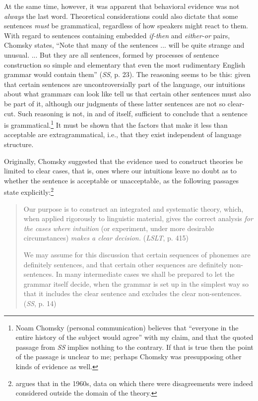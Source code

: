 At the same time, however, it was apparent that behavioral evidence was not \textit{always} the last word. Theoretical considerations could also dictate that some sentences \textit{must} be grammatical, regardless of how speakers might react to them. With regard to sentences containing embedded \textit{if-then} and \textit{either-or} pairs, Chomsky states, ``Note that many of the sentences ... will be quite strange and unusual. ... But they are all  sentences, formed by processes of sentence construction so simple and elementary that even the most rudimentary English grammar would contain them'' (\textit{SS}, p. 23). The reasoning seems to be this: given that
certain sentences are uncontroversially part of the language, our intuitions about what grammars can look like tell us that certain other sentences must also be part of it, although our judgments of these latter sentences are not so clear-cut. Such reasoning is not, in and of itself, sufficient to conclude that a sentence is grammatical.\footnote{Noam Chomsky (personal communication) believes that ``everyone in the entire history of the subject would agree'' with my claim, and that the quoted passage from \textit{SS} implies nothing to the contrary. If that is true then the point of the passage is unclear to me; perhaps Chomsky was presupposing other kinds of evidence as well.
} It must be shown that the factors that make it less than acceptable are extragrammatical, i.e., that they exist independent of language structure.

Originally, Chomsky suggested that the evidence used to construct theories be limited to clear cases, that is, ones where our intuitions leave no doubt as to whether the sentence is acceptable or unacceptable, as the following passages state explicitly:\footnote{\citet{Carden1973} argues that in the 1960s, data on which there were disagreements were indeed considered outside the domain of the theory.
}
\begin{quote}
Our purpose is to construct an integrated and systematic theory, which, when applied rigorously to linguistic material, gives the correct analysis \textit{for the cases where intuition} (or experiment, under more desirable circumstances) \textit{makes a clear decision.} (\textit{LSLT}, p. 415)

We may assume for this discussion that certain sequences of phonemes are definitely sentences, and that certain other sequences are definitely non-sentences. In many intermediate cases we shall be prepared to let the grammar itself decide, when the grammar is set up in the simplest way so that it includes the clear sentence and excludes the clear non-sentences. (\textit{SS}, p. 14)
 \end{quote}
 
